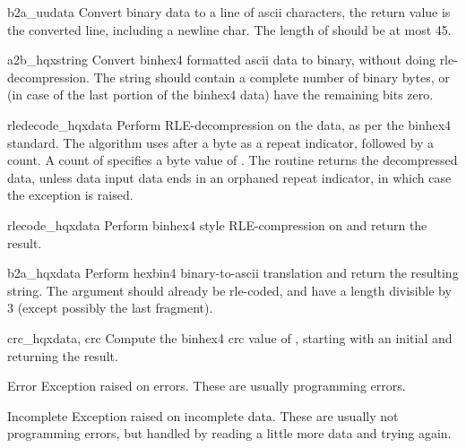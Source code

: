 \begin{funcdesc}{b2a_uu}{data}
Convert binary data to a line of ascii characters, the return value is
the converted line, including a newline char. The length of 
should be at most 45.
\end{funcdesc}

\begin{funcdesc}{a2b_hqx}{string}
Convert binhex4 formatted ascii data to binary, without doing
rle-decompression. The string should contain a complete number of
binary bytes, or (in case of the last portion of the binhex4 data)
have the remaining bits zero.
\end{funcdesc}

\begin{funcdesc}{rledecode_hqx}{data}
Perform RLE-decompression on the data, as per the binhex4
standard. The algorithm uses  after a byte as a repeat
indicator, followed by a count. A count of  specifies a byte
value of . The routine returns the decompressed data,
unless data input data ends in an orphaned repeat indicator, in which
case the  exception is raised.
\end{funcdesc}

\begin{funcdesc}{rlecode_hqx}{data}
Perform binhex4 style RLE-compression on  and return the
result.
\end{funcdesc}

\begin{funcdesc}{b2a_hqx}{data}
Perform hexbin4 binary-to-ascii translation and return the resulting
string. The argument should already be rle-coded, and have a length
divisible by 3 (except possibly the last fragment).
\end{funcdesc}

\begin{funcdesc}{crc_hqx}{data, crc}
Compute the binhex4 crc value of , starting with an initial
 and returning the result.
\end{funcdesc}
 
\begin{excdesc}{Error}
Exception raised on errors. These are usually programming errors.
\end{excdesc}

\begin{excdesc}{Incomplete}
Exception raised on incomplete data. These are usually not programming
errors, but handled by reading a little more data and trying again.
\end{excdesc}
